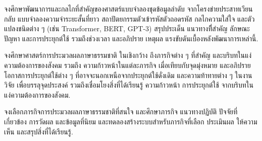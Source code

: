 \begin{Exercise}
	\label{ex: nlp Attention and Transformer}
	
	จงศึกษาพัฒนาการและกลไกที่สำคัญของศาสตร์แบบจำลองชุดข้อมูลลำดับ
	จากโครงข่ายประสาทเวียนกลับ แบบจำลองความจำระยะสั้นที่ยาว
	สถาปัตยกรรมตัวเข้ารหัสตัวถอดรหัส กลไกความใส่ใจ และตัวแปลงชนิดต่าง ๆ (เช่น Transformer, BERT, GPT-3)
สรุปประเด็น แนวทางทีี่สำคัญ ลักษณะปัญหา และการประยุกต์ใช้ รวมถึงช่วงเวลา	
และอภิปราย เหตุผล แรงขับดันเบื้องหลังพัฒนาการเหล่านี้.
	
\end{Exercise}

\begin{Exercise}
	\label{ex: nlp overview}

จงศึกษาศาสตร์การประมวลผลภาษาธรรมชาติ ในเชิงกว้าง
ถึงภารกิจต่าง ๆ ที่สำคัญ และบริบทในแง่ความต้องการของสังคม
รวมถึง ความก้าวหน้าในแต่ละภารกิจ เมื่อเทียบกับจุดมุ่งหมาย
และอภิปรายโอกาสการประยุกต์ใช้ต่าง ๆ ที่อาจจะนอกเหนือจากประยุกต์ใช้ดั่งเดิม
และความท้าทายต่าง ๆ ในงานวิจัย เพื่อบรรลุจุดประสงค์
รวมถึงเชื่อมโยงสิ่งที่ได้เรียนรู้ ความก้าวหน้า การประยุกต์ใช้ จากบริบทในแง่ความต้องการของสังคม.

\end{Exercise}


\begin{Exercise}
	\label{ex: nlp open task}
	
	จงเลือกภารกิจการประมวลผลภาษาธรรมชาติที่สนใจ
	และศึกษาภารกิจ แนวทางปฏิบัติ ปัจจัยที่เกี่ยวข้อง การวัดผล และข้อมูลที่นิยม
	และทดลองสร้างระบบสำหรับภารกิจที่เลือก ประเมินผล ให้ความเห็น และสรุปสิ่งที่ได้เรียนรู้.
	
\end{Exercise}
